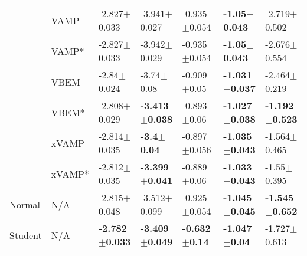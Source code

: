 \begin{tabular}{lllllll}
        & VAMP &           -2.827$\pm$0.033 &           -3.941$\pm$0.027 &          -0.935$\pm$0.054 &   \textbf{-1.05$\pm$0.043} &           -2.719$\pm$0.502 \\
        & VAMP* &           -2.827$\pm$0.033 &           -3.942$\pm$0.029 &          -0.935$\pm$0.054 &   \textbf{-1.05$\pm$0.043} &           -2.676$\pm$0.554 \\
        & VBEM &            -2.84$\pm$0.024 &             -3.74$\pm$0.08 &           -0.909$\pm$0.05 &  \textbf{-1.031$\pm$0.037} &           -2.464$\pm$0.219 \\
        & VBEM* &           -2.808$\pm$0.029 &  \textbf{-3.413$\pm$0.038} &           -0.893$\pm$0.06 &  \textbf{-1.027$\pm$0.038} &  \textbf{-1.192$\pm$0.523} \\
        & xVAMP &           -2.814$\pm$0.035 &     \textbf{-3.4$\pm$0.04} &          -0.897$\pm$0.056 &  \textbf{-1.035$\pm$0.043} &           -1.564$\pm$0.465 \\
        & xVAMP* &           -2.812$\pm$0.035 &  \textbf{-3.399$\pm$0.041} &           -0.889$\pm$0.06 &  \textbf{-1.033$\pm$0.043} &            -1.55$\pm$0.395 \\
Normal & N/A &           -2.815$\pm$0.048 &           -3.512$\pm$0.099 &          -0.925$\pm$0.054 &  \textbf{-1.045$\pm$0.045} &  \textbf{-1.545$\pm$0.652} \\
Student & N/A &  \textbf{-2.782$\pm$0.033} &  \textbf{-3.409$\pm$0.049} &  \textbf{-0.632$\pm$0.14} &   \textbf{-1.047$\pm$0.04} &           -1.727$\pm$0.613 \\
\bottomrule
\end{tabular}

